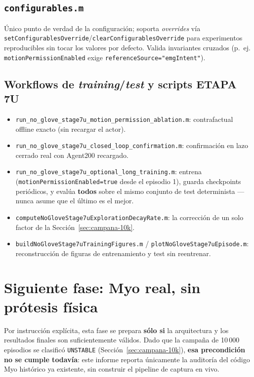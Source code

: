 \documentclass[11pt,a4paper]{article}
\begin{document}
\subsection{\texttt{configurables.m}}
Único punto de verdad de la configuración; soporta \emph{overrides} vía
\texttt{setConfigurablesOverride}/\texttt{clearConfigurablesOverride} para experimentos
reproducibles sin tocar los valores por defecto. Valida invariantes cruzados (p.~ej.
\texttt{motionPermissionEnabled} exige \texttt{referenceSource="emgIntent"}).

\subsection{Workflows de \emph{training}/\emph{test} y scripts ETAPA 7U}
\begin{itemize}
  \item \texttt{run\_no\_glove\_stage7u\_motion\_permission\_ablation.m}: contrafactual
    offline exacto (sin recargar el actor).
  \item \texttt{run\_no\_glove\_stage7u\_closed\_loop\_confirmation.m}: confirmación en
    lazo cerrado real con Agent200 recargado.
  \item \texttt{run\_no\_glove\_stage7u\_optional\_long\_training.m}: entrena
    (\texttt{motionPermissionEnabled=true} desde el episodio 1), guarda checkpoints
    periódicos, y evalúa \textbf{todos} sobre el mismo conjunto de test determinista ---
    nunca asume que el último es el mejor.
  \item \texttt{computeNoGloveStage7uExplorationDecayRate.m}: la corrección de un solo
    factor de la Sección~\ref{sec:campana-10k}.
  \item \texttt{buildNoGloveStage7uTrainingFigures.m} /
    \texttt{plotNoGloveStage7uEpisode.m}: reconstrucción de figuras de entrenamiento y
    test sin reentrenar.
\end{itemize}

\section{Siguiente fase: Myo real, sin prótesis física}
\label{sec:myo}

Por instrucción explícita, esta fase se prepara \textbf{sólo si} la arquitectura y los
resultados finales son suficientemente válidos. Dado que la campaña de 10\,000 episodios
se clasificó \texttt{UNSTABLE} (Sección~\ref{sec:campana-10k}), \textbf{esa precondición
no se cumple todavía}: este informe reporta únicamente la auditoría del código Myo
histórico ya existente, sin construir el pipeline de captura en vivo.
\end{document}
